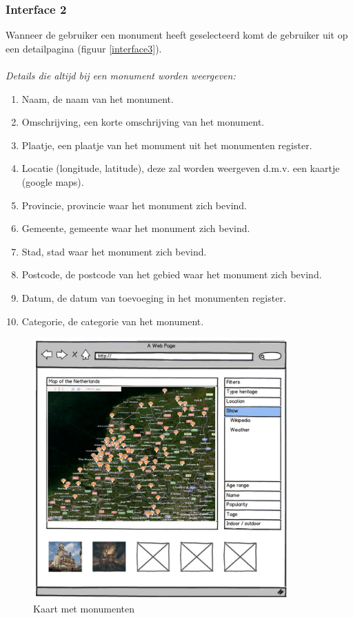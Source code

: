 \documentclass[a4paper,10pt]{article}
\begin{document}
			\subsubsection{Interface 2}
			Wanneer de gebruiker een monument heeft geselecteerd komt de gebruiker uit op een detailpagina (figuur \ref{interface3}).\\
			\\
			\textit{Details die altijd bij een monument worden weergeven:}
			\begin{enumerate}
				\item Naam, de naam van het monument.
				\item Omschrijving, een korte omschrijving van het monument.
				\item Plaatje, een plaatje van het monument uit het monumenten register.
				\item Locatie (longitude, latitude), deze zal worden weergeven d.m.v. een kaartje (google maps).
				\item Provincie, provincie waar het monument zich bevind.
				\item Gemeente, gemeente waar het monument zich bevind.
				\item Stad, stad waar het monument zich bevind.
				\item Postcode, de postcode van het gebied waar het monument zich bevind.
				\item Datum, de datum van toevoeging in het monumenten register.
				\item Categorie, de categorie van het monument.
			\end{enumerate}
			
			\begin{figure}[ht!]
				\centering
				\includegraphics[height=10cm]{interface1.png}
				\caption{Kaart met monumenten \label{interface1}}
			\end{figure}
			
\end{document}
